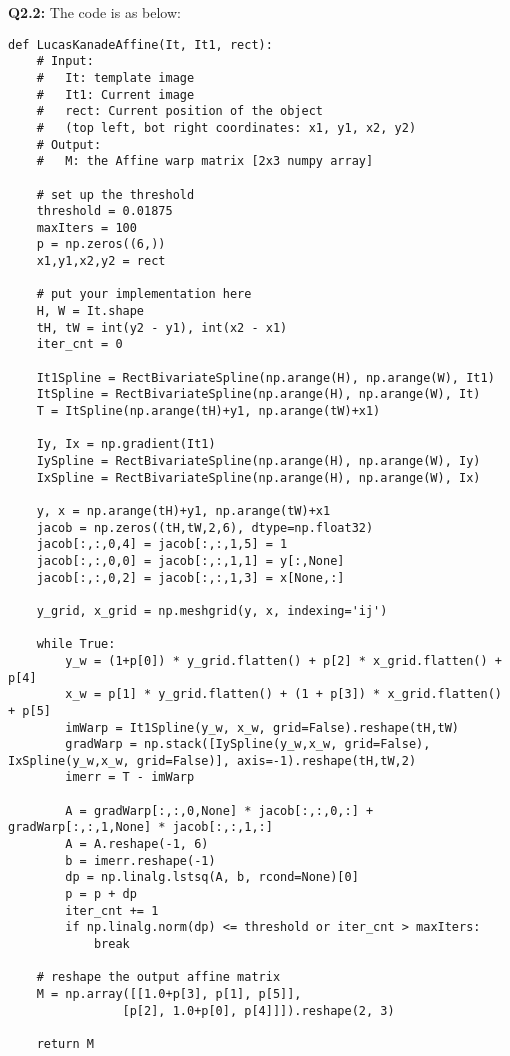 \documentclass[
  course = {{16-720B Computer Vision}},
  quartile = {{1}},
  assignment = 6\ -\ Object\ Tracking\ in\ Videos,
  name = {{Kangle Deng}},
  email = {{kangled@andrew.cmu.edu}},
  firstexercise = 1
]{aga-homework}
\begin{document}
\noindent\textbf{Q2.2:}
The code is as below:
\begin{lstlisting}
def LucasKanadeAffine(It, It1, rect):
    # Input: 
    #   It: template image
    #   It1: Current image
    #   rect: Current position of the object
    #   (top left, bot right coordinates: x1, y1, x2, y2)
    # Output:
    #   M: the Affine warp matrix [2x3 numpy array]

    # set up the threshold
    threshold = 0.01875
    maxIters = 100
    p = np.zeros((6,))
    x1,y1,x2,y2 = rect

    # put your implementation here
    H, W = It.shape
    tH, tW = int(y2 - y1), int(x2 - x1)
    iter_cnt = 0

    It1Spline = RectBivariateSpline(np.arange(H), np.arange(W), It1)
    ItSpline = RectBivariateSpline(np.arange(H), np.arange(W), It)
    T = ItSpline(np.arange(tH)+y1, np.arange(tW)+x1)

    Iy, Ix = np.gradient(It1)
    IySpline = RectBivariateSpline(np.arange(H), np.arange(W), Iy)
    IxSpline = RectBivariateSpline(np.arange(H), np.arange(W), Ix)

    y, x = np.arange(tH)+y1, np.arange(tW)+x1
    jacob = np.zeros((tH,tW,2,6), dtype=np.float32)
    jacob[:,:,0,4] = jacob[:,:,1,5] = 1
    jacob[:,:,0,0] = jacob[:,:,1,1] = y[:,None]
    jacob[:,:,0,2] = jacob[:,:,1,3] = x[None,:]

    y_grid, x_grid = np.meshgrid(y, x, indexing='ij')

    while True:
        y_w = (1+p[0]) * y_grid.flatten() + p[2] * x_grid.flatten() + p[4]
        x_w = p[1] * y_grid.flatten() + (1 + p[3]) * x_grid.flatten() + p[5]
        imWarp = It1Spline(y_w, x_w, grid=False).reshape(tH,tW)
        gradWarp = np.stack([IySpline(y_w,x_w, grid=False), IxSpline(y_w,x_w, grid=False)], axis=-1).reshape(tH,tW,2)
        imerr = T - imWarp
        
        A = gradWarp[:,:,0,None] * jacob[:,:,0,:] + gradWarp[:,:,1,None] * jacob[:,:,1,:]
        A = A.reshape(-1, 6)
        b = imerr.reshape(-1)
        dp = np.linalg.lstsq(A, b, rcond=None)[0]
        p = p + dp
        iter_cnt += 1
        if np.linalg.norm(dp) <= threshold or iter_cnt > maxIters:
            break

    # reshape the output affine matrix
    M = np.array([[1.0+p[3], p[1], p[5]],
                [p[2], 1.0+p[0], p[4]]]).reshape(2, 3)

    return M
\end{lstlisting}
\end{document}
